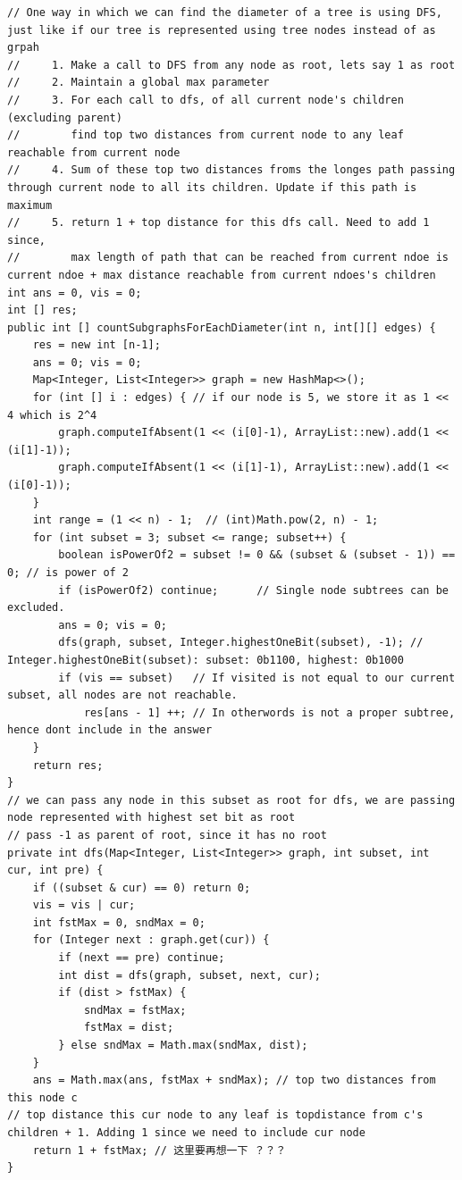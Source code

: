 \documentclass[9pt, b5paaper]{book}
\begin{document}
\begin{verbatim}
// One way in which we can find the diameter of a tree is using DFS, just like if our tree is represented using tree nodes instead of as grpah
//     1. Make a call to DFS from any node as root, lets say 1 as root
//     2. Maintain a global max parameter
//     3. For each call to dfs, of all current node's children (excluding parent)
//        find top two distances from current node to any leaf reachable from current node
//     4. Sum of these top two distances froms the longes path passing through current node to all its children. Update if this path is maximum
//     5. return 1 + top distance for this dfs call. Need to add 1 since,
//        max length of path that can be reached from current ndoe is current ndoe + max distance reachable from current ndoes's children
int ans = 0, vis = 0;
int [] res;
public int [] countSubgraphsForEachDiameter(int n, int[][] edges) {
    res = new int [n-1];
    ans = 0; vis = 0;
    Map<Integer, List<Integer>> graph = new HashMap<>();
    for (int [] i : edges) { // if our node is 5, we store it as 1 << 4 which is 2^4
        graph.computeIfAbsent(1 << (i[0]-1), ArrayList::new).add(1 << (i[1]-1));
        graph.computeIfAbsent(1 << (i[1]-1), ArrayList::new).add(1 << (i[0]-1));
    }
    int range = (1 << n) - 1;  // (int)Math.pow(2, n) - 1;
    for (int subset = 3; subset <= range; subset++) {
        boolean isPowerOf2 = subset != 0 && (subset & (subset - 1)) == 0; // is power of 2
        if (isPowerOf2) continue;      // Single node subtrees can be excluded.
        ans = 0; vis = 0;
        dfs(graph, subset, Integer.highestOneBit(subset), -1); // Integer.highestOneBit(subset): subset: 0b1100, highest: 0b1000
        if (vis == subset)   // If visited is not equal to our current subset, all nodes are not reachable.
            res[ans - 1] ++; // In otherwords is not a proper subtree, hence dont include in the answer
    }
    return res;
}
// we can pass any node in this subset as root for dfs, we are passing node represented with highest set bit as root
// pass -1 as parent of root, since it has no root
private int dfs(Map<Integer, List<Integer>> graph, int subset, int cur, int pre) {
    if ((subset & cur) == 0) return 0;
    vis = vis | cur; 
    int fstMax = 0, sndMax = 0;
    for (Integer next : graph.get(cur)) {
        if (next == pre) continue;
        int dist = dfs(graph, subset, next, cur);
        if (dist > fstMax) {
            sndMax = fstMax;
            fstMax = dist;
        } else sndMax = Math.max(sndMax, dist);
    }
    ans = Math.max(ans, fstMax + sndMax); // top two distances from this node c
// top distance this cur node to any leaf is topdistance from c's children + 1. Adding 1 since we need to include cur node
    return 1 + fstMax; // 这里要再想一下 ？？？
}
\end{verbatim}
\end{document}
